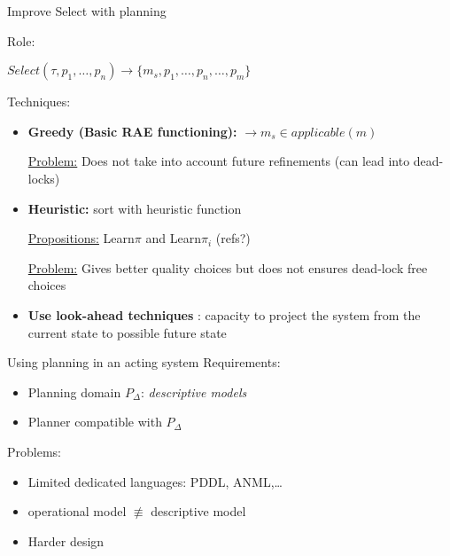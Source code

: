 \begin{frame}{Improve Select with planning}
    \begin{center}
        
    Role:
    
    $Select(\tau, p_1,\dots,p_n) \rightarrow \{m_s, p_1, \dots, p_n,\dots,p_m\}$

    \end{center}

    Techniques:
    \begin{itemize}

    \item \textbf{Greedy (Basic RAE functioning):} $\rightarrow m_s \in applicable(m)$
    \pause
    
    \underline{Problem:} Does not take into account future refinements (can lead into dead-locks)
    \pause
    
    \item \textbf{Heuristic:} sort with heuristic function
    \pause
    
    \underline{Propositions:} Learn$\pi$ and Learn$\pi_i$ (refs?)
    \pause
    
    \underline{Problem:} Gives better quality choices but does not ensures dead-lock free choices
    \pause
    \item \textbf<5->{Use look-ahead techniques} : capacity to project the system from the current state to possible future state

    \end{itemize}
\end{frame}
\begin{frame}{Using planning in an acting system}
    Requirements:
    \begin{itemize}
        \item Planning domain $P_\Delta$: \textit{descriptive models}
        \item Planner compatible with $P_\Delta$
    \end{itemize}
    Problems: 
    \begin{itemize}
        \item Limited dedicated languages: PDDL, ANML,\dots
        \item operational model $\not\equiv$ descriptive model
        \item Harder design 
    \end{itemize}

\end{frame}
